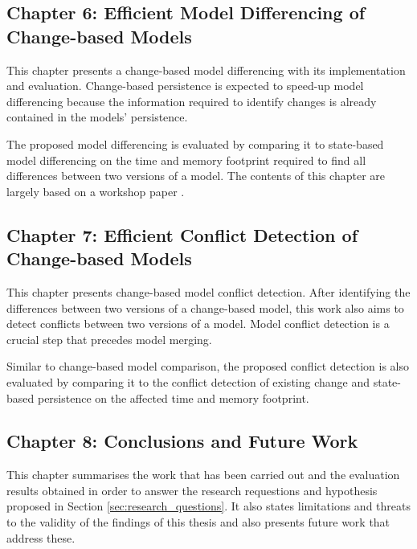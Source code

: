 \subsection{Chapter 6: Efficient Model Differencing of Change-based Models}
\label{sec:chapter_6_model_differencing}
This chapter presents a change-based model differencing with its implementation and evaluation. Change-based persistence is expected to speed-up model differencing because the information required to identify changes is already contained in the models' persistence. 

The proposed model differencing is evaluated by comparing it to state-based model differencing on the time and memory footprint required to find all differences between two versions of a model. The contents of this chapter are largely based on a workshop paper \cite{yohannis2019efficient}.

\subsection{Chapter 7: Efficient Conflict Detection of Change-based Models}
\label{sec:chapter_7_conflict_detection}
This chapter presents change-based model conflict detection. After identifying the differences between two versions of a change-based model, this work also aims to detect conflicts between two versions of a model. Model conflict detection is a crucial step that precedes model merging.

Similar to change-based model comparison, the proposed conflict detection is also evaluated by comparing it to the conflict detection of existing change and state-based persistence on the affected time and memory footprint.

\subsection{Chapter 8: Conclusions and Future Work}
\label{sec:chapter_8_conclusions_and_future_work}
This chapter summarises the work that has been carried out and the evaluation results obtained in order to answer the research requestions and hypothesis proposed in Section \ref{sec:research_questions}. It also states limitations and threats to the validity of the findings of this thesis and also presents future work that address these.


